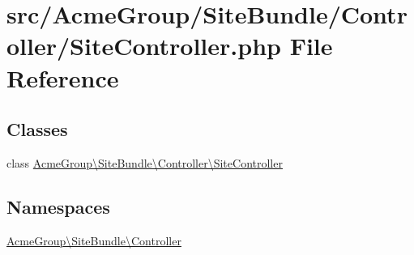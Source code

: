 \hypertarget{_site_controller_8php}{\section{src/\+Acme\+Group/\+Site\+Bundle/\+Controller/\+Site\+Controller.php File Reference}
\label{_site_controller_8php}
}
\subsection*{Classes}
\begin{DoxyCompactItemize}
\item 
class \hyperlink{class_acme_group_1_1_site_bundle_1_1_controller_1_1_site_controller}{Acme\+Group\textbackslash{}\+Site\+Bundle\textbackslash{}\+Controller\textbackslash{}\+Site\+Controller}
\end{DoxyCompactItemize}
\subsection*{Namespaces}
\begin{DoxyCompactItemize}
\item 
 \hyperlink{namespace_acme_group_1_1_site_bundle_1_1_controller}{Acme\+Group\textbackslash{}\+Site\+Bundle\textbackslash{}\+Controller}
\end{DoxyCompactItemize}
